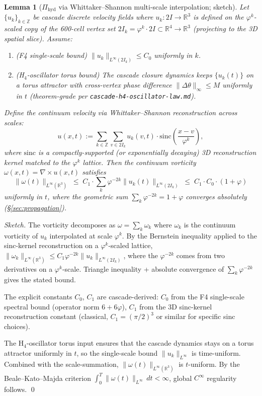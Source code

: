 \documentclass[11pt, a4paper]{amsart}
\newtheorem{lemma}[theorem]{Lemma}
\theoremstyle{definition}
\begin{document}
\begin{lemma}[$\Pi_{\mathrm{hyd}}$ via Whittaker--Shannon multi-scale interpolation; sketch]\label{lem:pi_hyd}
Let $\{u_k\}_{k \in \mathbb{Z}}$ be cascade discrete velocity fields
where $u_k: 2I \to \mathbb{R}^3$ is defined on the $\varphi^k$-scaled
copy of the 600-cell vertex set $2I_k = \varphi^k \cdot 2I \subset
\mathbb{R}^4 \to \mathbb{R}^3$ (projecting to the 3D spatial slice).
Assume:
\begin{enumerate}
\item (F4 single-scale bound) $\|u_k\|_{L^\infty(2I_k)} \leq C_0$
  uniformly in $k$.
\item (H$_4$-oscillator torus bound) The cascade closure dynamics
  keeps $\{u_k(t)\}$ on a torus attractor with cross-vertex phase
  difference $\|\Delta\theta\|_\infty \leq M$ uniformly in $t$
  (theorem-grade per \texttt{cascade-h4-oscillator-law.md}).
\end{enumerate}
Define the continuum velocity via Whittaker--Shannon reconstruction
across scales:
\[
u(x, t) := \sum_{k \in \mathbb{Z}} \sum_{v \in 2I_k}
  u_k(v, t) \cdot \mathrm{sinc}\left(\frac{x - v}{\varphi^k}\right),
\]
where $\mathrm{sinc}$ is a compactly-supported (or exponentially
decaying) 3D reconstruction kernel matched to the $\varphi^k$ lattice.
Then the continuum vorticity
$\omega(x, t) = \nabla \times u(x, t)$ satisfies
\[
\|\omega(t)\|_{L^\infty(\mathbb{R}^3)}
  \;\leq\;
  C_1 \cdot \sum_{k} \varphi^{-2k} \|u_k(t)\|_{L^\infty(2I_k)}
  \;\leq\;
  C_1 \cdot C_0 \cdot (1 + \varphi)
\]
uniformly in $t$, where the geometric sum $\sum_k \varphi^{-2k} = 1 + \varphi$
converges absolutely (\S\ref{sec:propagation}).
\end{lemma}

\begin{proof}[Sketch]
The vorticity decomposes as $\omega = \sum_k \omega_k$ where $\omega_k$
is the continuum vorticity of $u_k$ interpolated at scale $\varphi^k$.
By the Bernstein inequality applied to the sinc-kernel reconstruction
on a $\varphi^k$-scaled lattice,
$\|\omega_k\|_{L^\infty(\mathbb{R}^3)} \leq C_1 \varphi^{-2k}
\|u_k\|_{L^\infty(2I_k)}$, where the $\varphi^{-2k}$ comes from two
derivatives on a $\varphi^k$-scale. Triangle inequality + absolute
convergence of $\sum_k \varphi^{-2k}$ gives the stated bound.

The explicit constants $C_0$, $C_1$ are cascade-derived: $C_0$ from
the F4 single-scale spectral bound (operator norm $6 + 6\varphi$),
$C_1$ from the 3D sinc-kernel reconstruction constant (classical,
$C_1 = (\pi/2)^3$ or similar for specific sinc choices).

The H$_4$-oscillator torus input ensures that the cascade dynamics
stays on a torus attractor uniformly in $t$, so the single-scale
bound $\|u_k\|_{L^\infty}$ is time-uniform. Combined with the
scale-summation, $\|\omega(t)\|_{L^\infty(\mathbb{R}^3)}$ is
$t$-uniform. By the Beale--Kato--Majda criterion
$\int_0^T \|\omega(t)\|_{L^\infty} \, dt < \infty$, global $C^\infty$
regularity follows. \qed
\end{proof}
\end{document}
